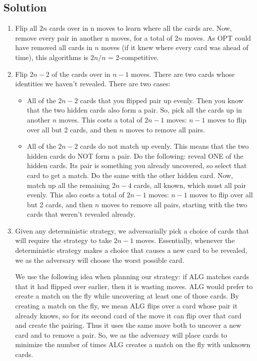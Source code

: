 \documentclass{article}
\begin{document}
\subsection*{Solution}
  \begin{enumerate}
    \item Flip all $2n$ cards over in n moves to learn where all the cards are. Now, remove every pair in another n moves, for a total of $2n$ moves. As OPT could have removed all cards in $n$ moves (if it knew where every card was ahead of time), this algorithms is $2n/n$ = $2$-competitive. 
    \item Flip $2n - 2$ of the cards over in $n-1$ moves. There are two cards whose identities we haven't revealed. There are two cases:
      \begin{itemize}
        \item All of the $2n - 2$ cards that you flipped pair up evenly. Then
          you know that the two hidden cards also form a pair. So, pick all
          the cards up in another $n$ moves. This costs a total of $2n - 1$
          moves: $n-1$ moves to flip over all but 2 cards, and then $n$ moves to remove all pairs. 
        \item All of the $2n - 2$ cards do not match up evenly. This means
          that the two hidden cards do NOT form a pair. Do the following:
          reveal ONE of the hidden cards. Its pair is something you already
          uncovered, so select that card to get a match.
          Do the same with the other hidden card.
          Now, match up all the remaining $2n - 4$ cards, all known,
          which must all pair evenly. This also costs a total of $2n -1$ moves: $n-1$ moves to flip over all but 2 cards, and then $n$ moves to remove all pairs, starting with the two cards that weren't revealed already. 
      \end{itemize}
    \item Given any deterministic strategy, we adversarially pick a choice of cards that will require the strategy to take $2n - 1$ moves. Essentially, whenever the deterministic strategy makes a choice that causes a new card to be revealed, we as the adversary will choose the worst possible card.

    \vspace{3mm}
    We use the following idea when planning our strategy: if ALG matches cards that it had flipped over earlier, then it is wasting moves. ALG would prefer to create a match on the fly while uncovering at least one of those cards. By creating a match  on the fly, we mean ALG flips over a card whose pair it already knows,  so for its second card of the move it can flip over that card and create the pairing. Thus it uses the same move both to uncover a new card and to remove a pair. So, we as the adversary will place cards to minimize the number of
    times ALG creates a match on the fly with unknown cards.


\end{enumerate}
\end{document}
